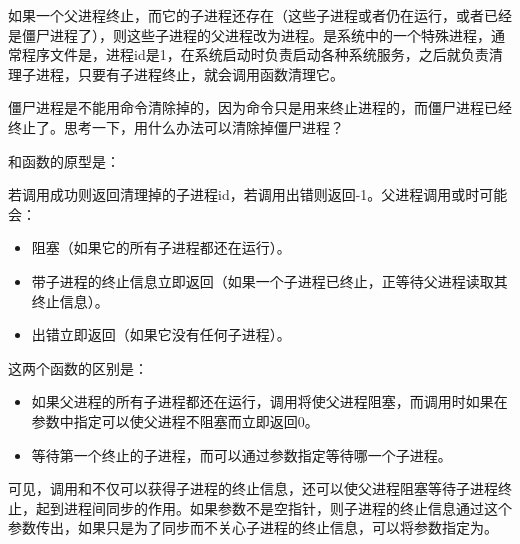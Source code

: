 如果一个父进程终止，而它的子进程还存在（这些子进程或者仍在运行，或者已经是僵尸进程了），则这些子进程的父进程改为进程。是系统中的一个特殊进程，通常程序文件是，进程id是1，在系统启动时负责启动各种系统服务，之后就负责清理子进程，只要有子进程终止，就会调用函数清理它。



僵尸进程是不能用命令清除掉的，因为命令只是用来终止进程的，而僵尸进程已经终止了。思考一下，用什么办法可以清除掉僵尸进程？



和函数的原型是：




若调用成功则返回清理掉的子进程id，若调用出错则返回-1。父进程调用或时可能会：


\begin{itemize}

\item 阻塞（如果它的所有子进程都还在运行）。

\item 带子进程的终止信息立即返回（如果一个子进程已终止，正等待父进程读取其终止信息）。

\item 出错立即返回（如果它没有任何子进程）。
\end{itemize}


这两个函数的区别是：


\begin{itemize}

\item 如果父进程的所有子进程都还在运行，调用将使父进程阻塞，而调用时如果在参数中指定可以使父进程不阻塞而立即返回0。

\item {}等待第一个终止的子进程，而可以通过参数指定等待哪一个子进程。
\end{itemize}


可见，调用和不仅可以获得子进程的终止信息，还可以使父进程阻塞等待子进程终止，起到进程间同步的作用。如果参数不是空指针，则子进程的终止信息通过这个参数传出，如果只是为了同步而不关心子进程的终止信息，可以将参数指定为。


